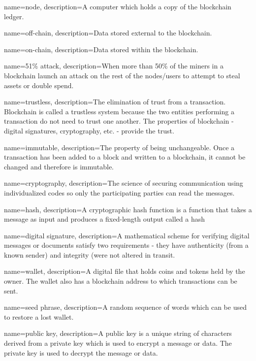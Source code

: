  {
	name=node,
	description={A computer which holds a copy of the blockchain ledger.}
}

 {
	name=off-chain,
	description={Data stored external to the blockchain.}
}

 {
	name=on-chain,
	description={Data stored within the blockchain.}
}


 {
	name=51\% attack,
	description={When more than 50\% of the miners in a blockchain launch an attack on the rest of the nodes/users to attempt to steal assets or double spend.}
}


 {
	name=trustless,
	description={The elimination of trust from a transaction. Blockchain is called a trustless system because the two entities performing a transaction do not need to trust one another. The properties of blockchain - digital signatures, cryptography, etc. - provide the trust.}
}

 {
	name=immutable,
	description={The property of being unchangeable. Once a transaction has been added to a block and written to a blockchain, it cannot be changed and therefore is immutable.}
}

 {
	name=cryptography,
	description={The science of securing communication using individualized codes so only the participating parties can read the messages.}
}

 {
	name=hash,
	description={A cryptographic hash function is a function that takes a message as input and produces a fixed-length output called a hash}
}

 {
	name=digital signature,
	description={A mathematical scheme for verifying digital messages or documents satisfy two requirements - they have authenticity (from a known sender) and integrity (were not altered in transit.}
}

 {
	name=wallet,
	description={A digital file that holds coins and tokens held by the owner. The wallet also has a blockchain address to which transactions can be sent.}
}

 {
	name=seed phrase,
	description={A random sequence of words which can be used to restore a lost wallet.}
}

 {
	name=public key,
	description={A public key is a unique string of characters derived from a private key which is used to encrypt a message or data. The private key is used to decrypt the message or data.}
}



